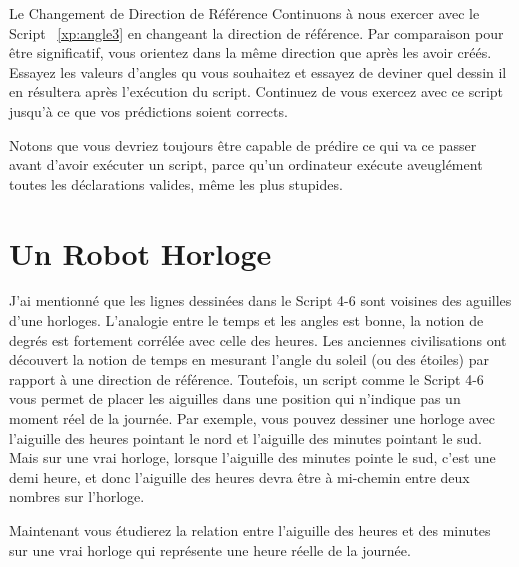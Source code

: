 \documentclass[a4paper,10pt,twoside]{book}
\begin{document}
\begin{exonofigtitle}{Le Changement de Direction de R\'ef\'erence}
Continuons \`a nous exercer avec le Script ~\ref{xp:angle3} en changeant la direction de r\'ef\'erence. Par comparaison 
pour \^etre significatif, vous orientez dans la m\^eme direction que  apr\`es les avoir cr\'e\'es. Essayez 
les valeurs d'angles qu vous souhaitez et essayez de deviner quel dessin il en r\'esultera apr\`es l'ex\'ecution du script. 
Continuez de vous exercez avec ce script jusqu'\`a ce que vos pr\'edictions soient corrects.
\end{exonofigtitle}

Notons que vous devriez toujours \^etre capable de pr\'edire ce qui va ce passer avant d'avoir ex\'ecuter un script, 
parce qu'un ordinateur ex\'ecute aveugl\'ement toutes les d\'eclarations valides, m\^eme les plus stupides.

\section{Un Robot Horloge}

J'ai mentionn\'e que les lignes dessin\'ees dans le Script 4-6 sont voisines des aguilles d'une horloges. 
L'analogie entre le temps et les angles est bonne, la notion de degr\'es est fortement corr\'el\'ee avec celle 
des heures. Les anciennes civilisations ont d\'ecouvert la notion de temps en mesurant l'angle du soleil 
(ou des \'etoiles) par rapport \`a une direction de r\'ef\'erence. Toutefois, un script comme le Script 4-6 vous permet 
de placer les aiguilles dans une position qui n'indique pas un moment r\'eel de la journ\'ee. Par exemple, 
vous pouvez dessiner une horloge avec l'aiguille des heures pointant le nord et l'aiguille des minutes 
pointant le sud. Mais sur une vrai horloge, lorsque l'aiguille des minutes pointe le sud, c'est une demi heure, 
et donc l'aiguille des heures devra \^etre \`a mi-chemin entre deux nombres sur l'horloge.

Maintenant vous \'etudierez la relation entre l'aiguille des heures et des minutes sur une vrai horloge 
qui repr\'esente une heure r\'eelle de la journ\'ee.

\end{document}
